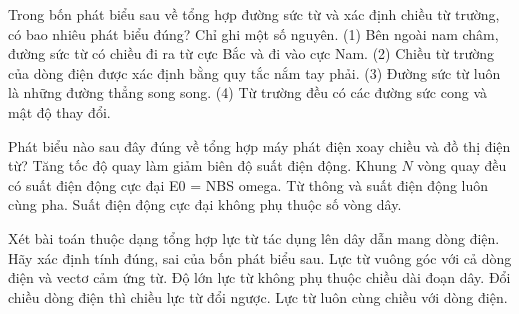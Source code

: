 \begin{ex}
Trong bốn phát biểu sau về tổng hợp đường sức từ và xác định chiều từ trường, có bao nhiêu phát biểu đúng? Chỉ ghi một số nguyên. (1) Bên ngoài nam châm, đường sức từ có chiều đi ra từ cực Bắc và đi vào cực Nam. (2) Chiều từ trường của dòng điện được xác định bằng quy tắc nắm tay phải. (3) Đường sức từ luôn là những đường thẳng song song. (4) Từ trường đều có các đường sức cong và mật độ thay đổi.
\end{ex}

\begin{ex}
Phát biểu nào sau đây đúng về tổng hợp máy phát điện xoay chiều và đồ thị điện từ?
\choice
{Tăng tốc độ quay làm giảm biên độ suất điện động.}
{\True Khung $N$ vòng quay đều có suất điện động cực đại E0 = NBS omega.}
{Từ thông và suất điện động luôn cùng pha.}
{Suất điện động cực đại không phụ thuộc số vòng dây.}
\end{ex}

\begin{ex}
Xét bài toán thuộc dạng tổng hợp lực từ tác dụng lên dây dẫn mang dòng điện. Hãy xác định tính đúng, sai của bốn phát biểu sau.
\choiceTF
{\True Lực từ vuông góc với cả dòng điện và vectơ cảm ứng từ.}
{Độ lớn lực từ không phụ thuộc chiều dài đoạn dây.}
{\True Đổi chiều dòng điện thì chiều lực từ đổi ngược.}
{Lực từ luôn cùng chiều với dòng điện.}
\end{ex}

